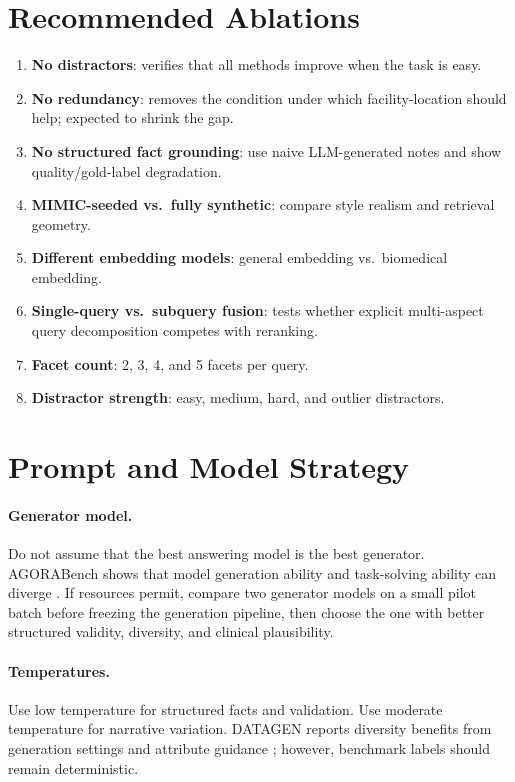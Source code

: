 \documentclass[11pt,a4paper]{article}
\begin{document}
\section{Recommended Ablations}

\begin{enumerate}[leftmargin=*]
	\item \textbf{No distractors}: verifies that all methods improve when the task is easy.
	\item \textbf{No redundancy}: removes the condition under which facility-location should help; expected to shrink the gap.
	\item \textbf{No structured fact grounding}: use naive LLM-generated notes and show quality/gold-label degradation.
	\item \textbf{MIMIC-seeded vs.\ fully synthetic}: compare style realism and retrieval geometry.
	\item \textbf{Different embedding models}: general embedding vs.\ biomedical embedding.
	\item \textbf{Single-query vs.\ subquery fusion}: tests whether explicit multi-aspect query decomposition competes with reranking.
	\item \textbf{Facet count}: 2, 3, 4, and 5 facets per query.
	\item \textbf{Distractor strength}: easy, medium, hard, and outlier distractors.
\end{enumerate}

\section{Prompt and Model Strategy}

\paragraph{Generator model.}
Do not assume that the best answering model is the best generator. AGORABench shows that model generation ability and task-solving ability can diverge \citep{kim2025agorabench}. If resources permit, compare two generator models on a small pilot batch before freezing the generation pipeline, then choose the one with better structured validity, diversity, and clinical plausibility.

\paragraph{Temperatures.}
Use low temperature for structured facts and validation. Use moderate temperature for narrative variation. DATAGEN reports diversity benefits from generation settings and attribute guidance \citep{huang2025datagen}; however, benchmark labels should remain deterministic.
\end{document}
